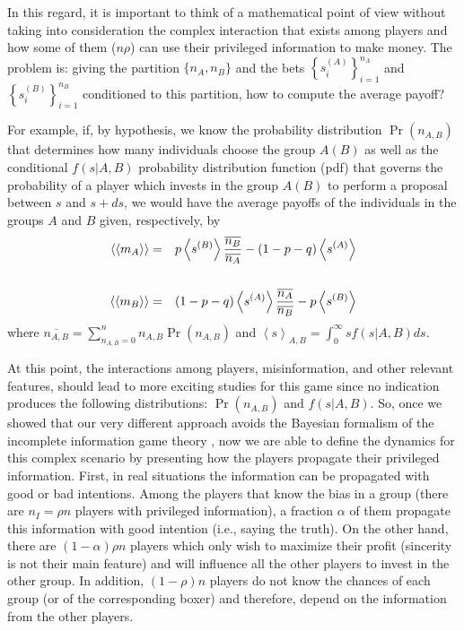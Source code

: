 \documentclass[3p, 11pt]{elsarticle}
\begin{document}
In this regard, it is important to think of a mathematical point of view
without taking into consideration the complex interaction that exists among
players and how some of them ($n\rho $) can use their privileged information
to make money. The problem is: giving the partition $\{n_{A},n_{B}\}$ and
the bets $\left\{ s_{i}^{(A)}\right\} _{i=1}^{n_{A}}$ and $\left\{
s_{i}^{(B)}\right\} _{i=1}^{n_{B}}$ conditioned to this partition, how to
compute the average payoff?

For example, if, by hypothesis, we know the probability distribution $\Pr
(n_{A,B})$ that determines how many individuals choose the group $A(B)$ as
well as the conditional $f(s|A,B)$ probability distribution function (pdf)
that governs the probability of a player which invests in the group $A(B)$
to perform a proposal between $s$ and $s+ds$, we would have the average
payoffs of the individuals in the groups $A$ and $B$ given, respectively, by 
\begin{eqnarray}
\left\langle \left\langle m_{A}\right\rangle \right\rangle &=&p\left\langle
s^{(B)}\right\rangle \frac{\overline{n_{B}}}{\overline{n_{A}}}%
-(1-p-q)\left\langle s^{(A)}\right\rangle  \label{Eq:averages} \\
&&  \notag \\
\left\langle \left\langle m_{B}\right\rangle \right\rangle
&=&(1-p-q)\left\langle s^{(A)}\right\rangle \frac{\overline{n_{A}}}{%
\overline{n_{B}}}-p\left\langle s^{(B)}\right\rangle  \label{Eq:averages3}
\end{eqnarray}%
where $\overline{n_{A,B}}=\sum_{n_{A,B}=0}^{n}n_{A,B}\Pr (n_{A,B})$ and $%
\left\langle s\right\rangle _{A,B}=\int_{0}^{\infty }sf(s|A,B)ds$.

At this point, the interactions among players, misinformation, and other
relevant features, should lead to more exciting studies for this game since
no indication produces the following distributions: $\Pr (n_{A,B})$ and $%
f(s|A,B)$. So, once we showed that our very different approach avoids the
Bayesian formalism of the incomplete information game theory \cite{Harsanyi}%
, now we are able to define the dynamics for this complex scenario by
presenting how the players propagate their privileged information. First, in
real situations the information can be propagated with good or bad
intentions. Among the players that know the bias in a group (there are $%
n_{I}=\rho n$ players with privileged information), a fraction $\alpha $ of
them propagate this information with good intention (i.e., saying the
truth). On the other hand, there are $(1-\alpha )\rho n$ players which only
wish to maximize their profit (sincerity is not their main feature) and will
influence all the other players to invest in the other group. In addition, $%
(1-\rho )n$ players do not know the chances of each group (or of the
corresponding boxer) and therefore, depend on the information from the other
players.
\end{document}
